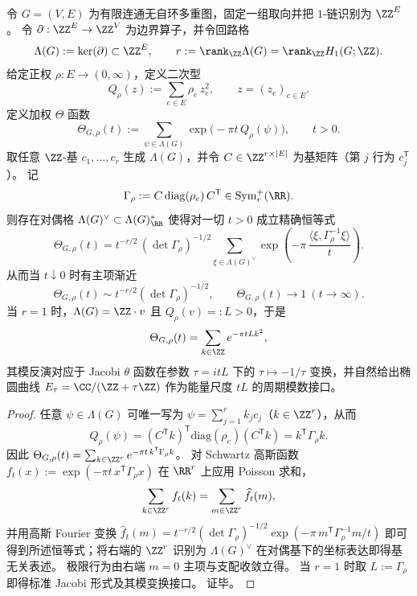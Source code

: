 
\begin{theorem}\label{thm:graph-cycle-lattice-theta-modular-inversion}
令 \(G=(V,E)\) 为有限连通无自环多重图，固定一组取向并把 \(1\)-链识别为 \(\ZZ^{E}\)。
令 \(\partial:\ZZ^{E}\to \ZZ^{V}\) 为边界算子，并令回路格
\[
\Lambda(G):=\ker(\partial)\subset \ZZ^{E},
\qquad
r:=\rank_{\ZZ}\Lambda(G)=\rank_{\ZZ}H_1(G;\ZZ).
\]
给定正权 \(\rho:E\to(0,\infty)\)，定义二次型
\[
Q_\rho(z):=\sum_{e\in E}\rho_e\,z_e^2,
\qquad z=(z_e)_{e\in E}.
\]
定义加权 \(\Theta\) 函数
\[
\Theta_{G,\rho}(t):=\sum_{\psi\in\Lambda(G)}\exp\!\bigl(-\pi t\,Q_\rho(\psi)\bigr),
\qquad t>0.
\]
取任意 \(\ZZ\)-基 \(c_1,\dots,c_r\) 生成 \(\Lambda(G)\)，并令 \(C\in\ZZ^{r\times |E|}\) 为基矩阵（第 \(j\) 行为 \(c_j^{\mathsf T}\)）。
记
\[
\Gamma_\rho:=C\,\mathrm{diag}(\rho_e)\,C^{\mathsf T}\in\mathrm{Sym}_r^+(\RR).
\]
则存在对偶格 \(\Lambda(G)^\vee\subset \Lambda(G)_{\RR}^\ast\) 使得对一切 \(t>0\) 成立精确恒等式
\[
\boxed{\;
\Theta_{G,\rho}(t)
=t^{-r/2}\,(\det\Gamma_\rho)^{-1/2}
\sum_{\xi\in \Lambda(G)^\vee}\exp\!\left(-\pi\,\frac{\langle\xi,\Gamma_\rho^{-1}\xi\rangle}{t}\right).
\;}
\]
从而当 \(t\downarrow 0\) 时有主项渐近
\[
\Theta_{G,\rho}(t)\sim t^{-r/2}(\det\Gamma_\rho)^{-1/2},
\qquad
\Theta_{G,\rho}(t)\to 1\ (t\to\infty).
\]
当 \(r=1\) 时，\(\Lambda(G)=\ZZ\cdot v\) 且 \(Q_\rho(v)=:L>0\)，于是
\[
\Theta_{G,\rho}(t)=\sum_{k\in\ZZ}e^{-\pi t L k^2},
\]
其模反演对应于 Jacobi \(\theta\) 函数在参数 \(\tau=i t L\) 下的 \(\tau\mapsto-1/\tau\) 变换，并自然给出椭圆曲线
\(
E_\tau=\CC/(\ZZ+\tau\ZZ)
\)
作为能量尺度 \(tL\) 的周期模数接口。
\end{theorem}
\begin{proof}
任意 \(\psi\in\Lambda(G)\) 可唯一写为 \(\psi=\sum_{j=1}^r k_j c_j\)（\(k\in\ZZ^r\)），从而
\[
Q_\rho(\psi)
=(C^{\mathsf T}k)^{\mathsf T}\mathrm{diag}(\rho_e)(C^{\mathsf T}k)
=k^{\mathsf T}\Gamma_\rho k.
\]
因此
\(
\Theta_{G,\rho}(t)=\sum_{k\in\ZZ^r}e^{-\pi t\,k^{\mathsf T}\Gamma_\rho k}
\)。
对 Schwartz 高斯函数 \(f_t(x):=\exp(-\pi t\,x^{\mathsf T}\Gamma_\rho x)\) 在 \(\RR^r\) 上应用 Poisson 求和，
\[
\sum_{k\in\ZZ^r}f_t(k)=\sum_{m\in\ZZ^r}\widehat f_t(m),
\]
并用高斯 Fourier 变换
\(
\widehat f_t(m)=t^{-r/2}(\det\Gamma_\rho)^{-1/2}\exp(-\pi\,m^{\mathsf T}\Gamma_\rho^{-1}m/t)
\)
即可得到所述恒等式；将右端的 \(\ZZ^r\) 识别为 \(\Lambda(G)^\vee\) 在对偶基下的坐标表达即得基无关表述。
极限行为由右端 \(m=0\) 主项与支配收敛立得。
当 \(r=1\) 时取 \(L:=\Gamma_\rho\) 即得标准 Jacobi 形式及其模变换接口。
证毕。
\end{proof}

